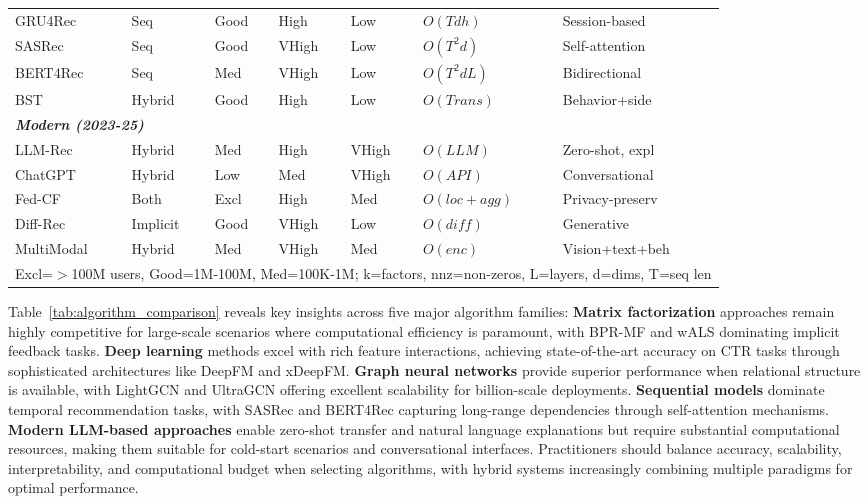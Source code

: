 \begin{table*}[ht]
\begin{tabular}{@{}p{1.8cm}p{1.3cm}p{1.1cm}p{1cm}p{1cm}p{1.2cm}p{2.2cm}@{}}
\midrule
GRU4Rec & Seq & Good & High & Low & $O(Tdh)$ & Session-based \\
SASRec & Seq & Good & VHigh & Low & $O(T^2d)$ & Self-attention \\
BERT4Rec & Seq & Med & VHigh & Low & $O(T^2dL)$ & Bidirectional \\
BST & Hybrid & Good & High & Low & $O(Trans)$ & Behavior+side \\
\midrule
\multicolumn{7}{l}{\textit{\textbf{Modern (2023-25)}}} \\
\midrule
LLM-Rec & Hybrid & Med & High & VHigh & $O(LLM)$ & Zero-shot, expl \\
ChatGPT & Hybrid & Low & Med & VHigh & $O(API)$ & Conversational \\
Fed-CF & Both & Excl & High & Med & $O(loc+agg)$ & Privacy-preserv \\
Diff-Rec & Implicit & Good & VHigh & Low & $O(diff)$ & Generative \\
MultiModal & Hybrid & Med & VHigh & Med & $O(enc)$ & Vision+text+beh \\
\bottomrule
\multicolumn{7}{l}{\scriptsize Excl=$>$100M users, Good=1M-100M, Med=100K-1M; k=factors, nnz=non-zeros, L=layers, d=dims, T=seq len} \\
\end{tabular}
\end{table*}

Table~\ref{tab:algorithm_comparison} reveals key insights across five major algorithm families: \textbf{Matrix factorization} approaches remain highly competitive for large-scale scenarios where computational efficiency is paramount, with BPR-MF and wALS dominating implicit feedback tasks. \textbf{Deep learning} methods excel with rich feature interactions, achieving state-of-the-art accuracy on CTR tasks through sophisticated architectures like DeepFM and xDeepFM. \textbf{Graph neural networks} provide superior performance when relational structure is available, with LightGCN and UltraGCN offering excellent scalability for billion-scale deployments. \textbf{Sequential models} dominate temporal recommendation tasks, with SASRec and BERT4Rec capturing long-range dependencies through self-attention mechanisms. \textbf{Modern LLM-based approaches} enable zero-shot transfer and natural language explanations but require substantial computational resources, making them suitable for cold-start scenarios and conversational interfaces. Practitioners should balance accuracy, scalability, interpretability, and computational budget when selecting algorithms, with hybrid systems increasingly combining multiple paradigms for optimal performance.

